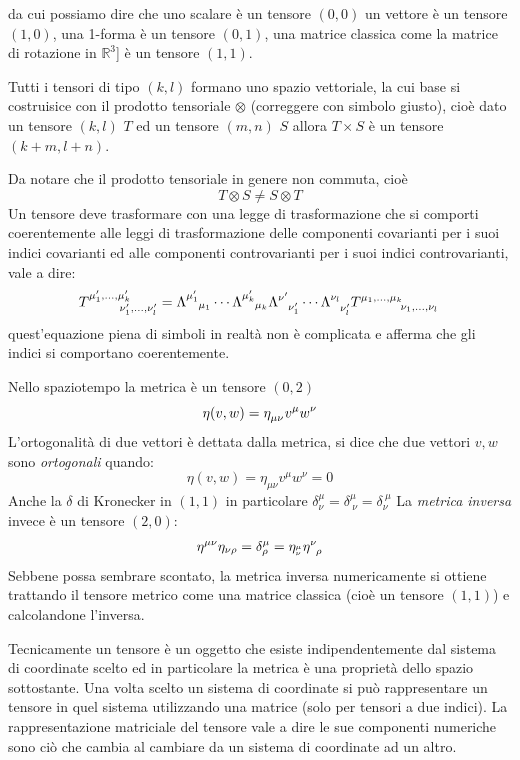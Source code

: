 \documentclass[twoside]{article}
\begin{document}
da cui possiamo dire che uno scalare è un tensore $(0,0)$ un vettore è un tensore $(1,0)$, una 1-forma è un tensore $(0,1)$, una matrice classica come la matrice di rotazione in $\mathbb{R}^3$] è un tensore $(1,1)$.

Tutti i tensori di tipo $(k,l)$ formano uno spazio vettoriale, la cui base si costruisice con il prodotto tensoriale $\otimes $ (correggere con simbolo giusto), cioè dato un tensore $(k,l)$ $T$ ed un tensore $(m,n)$ $S$ allora $T \times S$ è un tensore $(k+m,l+n)$.

Da notare che il prodotto tensoriale in genere non commuta, cioè
$$
T \otimes S \neq S \otimes T
$$
Un tensore deve trasformare con una legge di trasformazione che si comporti coerentemente alle leggi di trasformazione delle componenti covarianti 
per i suoi indici covarianti ed alle componenti controvarianti per i suoi indici controvarianti, vale a dire:
 \begin{equation}
 	T^{\mu'_1,\ldots,\mu'_k}_{\ \qquad\nu'_1,\ldots,\nu'_l} 
= \Lambda\indices{^{\mu'_1}_{\mu_1}} 
\cdots \Lambda\indices{^{\mu'_k}_{\mu_k}}  
\Lambda\indices{^{\nu'}_{\nu'_1}} \cdots 
 \Lambda\indices{^{\nu_l}_{\nu'_l}} T\indices{^{\mu_1,\ldots,\mu_k}_{\nu_1,\ldots,\nu_l}}
 \end{equation}
quest'equazione piena di simboli in realtà non è complicata e afferma che gli indici si comportano coerentemente.

Nello spaziotempo la metrica è un tensore $(0,2)$ 
\begin{equation}
	\eta(v,w) = \eta\indices{_\mu_\nu} v^\mu w^\nu
\end{equation}
L'ortogonalità di due vettori è dettata dalla metrica, si dice che due vettori $v,w$ sono \emph{ortogonali} quando: 
\begin{equation}
	\eta(v,w) = \eta_{\mu \nu} v^\mu w^\nu = 0
\end{equation}
Anche la $\delta $ di Kronecker in $(1,1)$ in particolare $\delta^{\mu}_{\nu} = \delta^{\mu}_{\ \nu} = \delta^{\  \mu}_{\nu}$
La \emph{metrica inversa} invece è un tensore $(2,0)$: 
\begin{equation}
	\eta\indices{^\mu^\nu}\eta_{\nu \rho} = \delta^{\mu}_{\rho} = \eta_{^\mu_\nu}\eta\indices{^\nu_\rho}
\end{equation}
Sebbene possa sembrare scontato, la metrica inversa numericamente si ottiene trattando il tensore metrico come una matrice classica (cioè un tensore $(1,1)$) e calcolandone l'inversa.

Tecnicamente un tensore è un oggetto che esiste indipendentemente dal sistema di coordinate scelto ed in particolare la metrica è una proprietà dello spazio sottostante. Una volta scelto un sistema di coordinate si può rappresentare un tensore in quel sistema utilizzando una matrice (solo per tensori a due indici). La rappresentazione matriciale del tensore vale a dire le sue componenti numeriche sono ciò che cambia al cambiare da un sistema di coordinate ad un altro.
\end{document}
